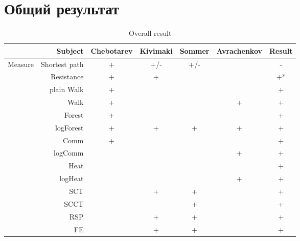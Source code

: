 \documentclass{article}
\begin{document}
\section*{Общий результат}

\begin{table}[H]
\centering
\caption{Overall result}
\label{my-label}
\begin{tabular}{rr|cccc|c}
                & Subject                  & Chebotarev & Kivimaki & Sommer & Avrachenkov & Result \\
                \hline
Measure         & Shortest path            & +          & \cellcolor{red!25} +/- & \cellcolor{red!25} +/- & & \cellcolor{red!25} - \\
                & Resistance               & +          & +        &        &             &  \cellcolor{yellow!25} +* \\
                & plain Walk               & +          &          &        &             & +      \\
                & Walk                     & +          &          &        & +           & +      \\
                & Forest                   & +          &          &        &             & +      \\
                & logForest                & +          & +        & +      & +           & +      \\
                & Comm                     & +          &          &        &             & +      \\
                & logComm                  &            &          &        & +           & +      \\
                & Heat                     &            &          &        &             & \cellcolor{yellow!25} + \\
                & logHeat                  &            &          &        & +           & +      \\
                & SCT                      &            & +        & +      &             & +      \\
                & SCCT                     &            &          & +      &             & +      \\
                & RSP                      &            & +        & +      &             & +      \\
                & FE                       &            & +        & +      &             & +      \\

\end{tabular}
\end{table}
\end{document}
